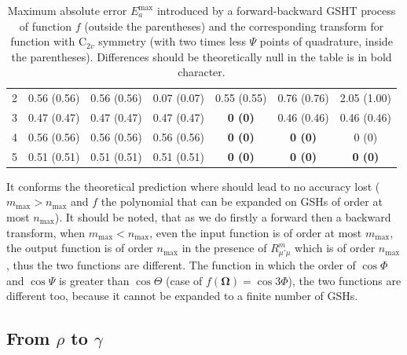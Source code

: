 \begin{table}[H]
\begin{centering}
{\begin{centering}
\begin{tabular*}{1\columnwidth}{@{\extracolsep{\fill}}ccccccc}
\multicolumn{1}{c}{{\footnotesize{}2}} & {\footnotesize{}0.56 (0.56)} & {\footnotesize{}0.56 (0.56)} & {\footnotesize{}0.07 (0.07)} & {\footnotesize{}0.55 (0.55)} & {\footnotesize{}0.76 (0.76)} & {\footnotesize{}2.05 (1.00)}\tabularnewline
{\footnotesize{}3} & {\footnotesize{}0.47 (0.47)} & {\footnotesize{}0.47 (0.47)} & {\footnotesize{}0.47 (0.47)} & \textbf{\footnotesize{}0 (0)} & {\footnotesize{}0.46 (0.46)} & {\footnotesize{}0.46 (0.46)}\tabularnewline
\multicolumn{1}{c}{{\footnotesize{}4}} & {\footnotesize{}0.56 (0.56)} & {\footnotesize{}0.56 (0.56)} & {\footnotesize{}0.56 (0.56)} & \textbf{\footnotesize{}0 (0)} & \textbf{\footnotesize{}0 (0)} & {\footnotesize{}0 (0)}\tabularnewline
\multicolumn{1}{c}{{\footnotesize{}5}} & {\footnotesize{}0.51 (0.51)} & {\footnotesize{}0.51 (0.51)} & {\footnotesize{}0.51 (0.51)} & \textbf{\footnotesize{}0 (0)} & \textbf{\footnotesize{}0 (0)} & \textbf{\footnotesize{}0 (0)}\tabularnewline
\bottomrule
\end{tabular*}
\par\end{centering}
}
\par\end{centering}
\caption[Maximum absolute error $E_{a}^{\mathrm{max}}$ introduced by a forward-backward
GSHT process]{Maximum absolute error $E_{a}^{\mathrm{max}}$ introduced by a forward-backward
GSHT process of function $f$ (outside the parentheses) and the corresponding
transform for function with $\mathrm{C}_{2v}$ symmetry (with two
times less $\Psi$ points of quadrature, inside the parentheses).
Differences should be theoretically null in the table is in bold character.
\label{tab:error-gsh}}
\end{table}

It conforms the theoretical prediction where should lead to no accuracy
lost ($m_{\max}>n_{\max}$ and $f$ the polynomial that can be expanded
on \acs{GSH}s of order at most $n_{\max}$). It should be noted,
that as we do firstly a forward then a backward transform, when $m_{\max}<n_{\max}$,
even the input function is of order at most $m_{\max}$, the output
function is of order $n_{\mathrm{max}}$ in the presence of $R_{\mu'\mu}^{m}$
which is of order $n_{\mathrm{max}}$, thus the two functions are
different. The function in which the order of $\cos\Phi$ and $\cos\Psi$
is greater than $\cos\Theta$ (case of $f(\mathbf{\Omega})=\cos3\Phi$),
the two functions are different too, because it cannot be expanded
to a finite number of \acs{GSH}s.

\subsection{From $\rho$ to $\gamma$}

